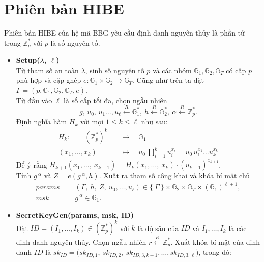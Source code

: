 \documentclass[class=report, crop=false]{standalone}
\begin{document}
	\section{Phiên bản HIBE}
		Phiên bản HIBE của hệ mã BBG yêu cầu định danh nguyên thủy là phần tử trong $\mathbb{Z}_p^*$ với $p$ là số nguyên tố.
		\vspace{-0.5\baselineskip}
		\begin{itemize}[leftmargin=1cm, itemindent=-1cm]
			\item[] {\sffamily\bfseries Setup($\lambda$, $\ell$)} \\
			Từ tham số an toàn $\lambda$, sinh số nguyên tố $p$ và các nhóm $\mathbb{G}_1, \mathbb{G}_2, \mathbb{G}_T$ có cấp $p$ phù hợp và cặp ghép $e: \mathbb{G}_1 \times \mathbb{G}_2 \rightarrow \mathbb{G}_T$. Cũng như trên ta đặt $\Gamma = (p, \mathbb{G}_1, \mathbb{G}_2, \mathbb{G}_T, e)$. \\
			Từ đầu vào $\ell$ là số cấp tối đa, chọn ngẫu nhiên
			\[
				g,\, u_0,\, u_1 \dots, u_\ell \xleftarrow{R} \mathbb{G}_1^*,\ h \xleftarrow{R} \mathbb{G}_2^*,\ \alpha \xleftarrow{R} \mathbb{Z}_p^*.
			\]
			Định nghĩa hàm $H_k$ với mọi $1 \leq k \leq \ell$ như sau:
			\begin{align*}
				H_k:\quad\quad 	(\mathbb{Z}_p^*)^k 	\quad	 &\rightarrow 	\quad  	\mathbb{G}_1 \\
								(x_1, \dots, x_k) 	\quad	 &\mapsto 		\quad  	u_0 \, \prod_{i = 1}^k u_i^{x_i} = u_0 \, u_1^{x_1}\dots u_k^{x_k}
			\end{align*}
			Để ý rằng $H_{k + 1}(x_1, \dots,\ x_{k + 1}) = H_k(x_1, \dots,\ x_k) \cdot (u_{k + 1})^{x_{k + 1}}$. \\
			Tính $g\,^\alpha$ và $Z = e(g\,^\alpha, h)$. Xuất ra tham số công khai và khóa bí mật chủ
			\begin{align*}
				params &= (\Gamma,\ h,\ Z,\ u_0, \dots, u_\ell) \in \{\ \Gamma \ \} \times \mathbb{G}_2 \times \mathbb{G}_T \times (\mathbb{G}_1)^{\ell + 1}, \\
				msk &= g\,^\alpha \in \mathbb{G}_1.
			\end{align*}
			\item[] {\sffamily\bfseries SecretKeyGen(params, msk, ID)} \\
			Đặt $ID = (I_1, \dots, I_k) \in (\mathbb{Z}_p^*)^k$ với $k$ là độ sâu của $ID$ và $I_1, \dots, I_k$ là các định danh nguyên thủy. Chọn ngẫu nhiên $r \xleftarrow{R} \mathbb{Z}_p^*$. Xuất khóa bí mật của định danh $ID$ là $sk_{ID} = \Big(sk_{ID, 1},\ sk_{ID, 2},\ sk_{ID, 3, k + 1}, \dots, sk_{ID, 3, \ell} \Big)$, trong đó:

\end{itemize}
\end{document}
